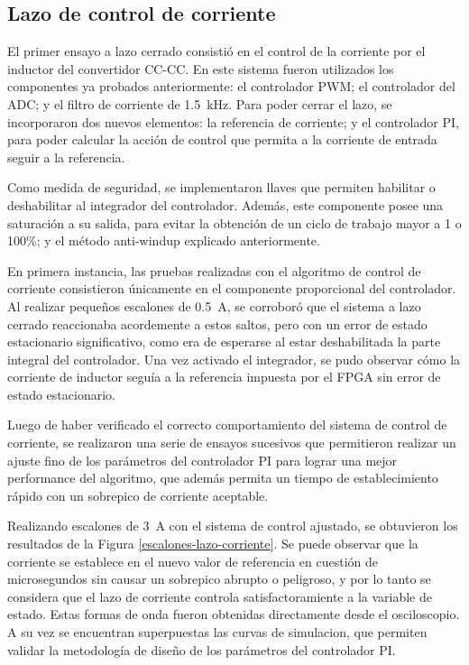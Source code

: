 \subsection{Lazo de control de corriente}

El primer ensayo a lazo cerrado consistió en el control de la corriente por el inductor del convertidor CC-CC. En este sistema fueron utilizados los componentes ya probados anteriormente: el controlador PWM; el controlador del ADC; y el filtro de corriente de \SI{1.5}{\kilo\hertz}. Para poder cerrar el lazo, se incorporaron dos nuevos elementos: la referencia de corriente; y el controlador PI, para poder calcular la acción de control que permita a la corriente de entrada seguir a la referencia.

Como medida de seguridad, se implementaron llaves que permiten habilitar o deshabilitar al integrador del controlador. Además, este componente posee una saturación a su salida, para evitar la obtención de un ciclo de trabajo mayor a 1 o 100\%; y el método anti-windup explicado anteriormente.

En primera instancia, las pruebas realizadas con el algoritmo de control de corriente consistieron únicamente en el componente proporcional del controlador. Al realizar pequeños escalones de \SI{0.5}{\ampere}, se corroboró que el sistema a lazo cerrado reaccionaba acordemente a estos saltos, pero con un error de estado estacionario significativo, como era de esperarse al estar deshabilitada la parte integral del controlador. Una vez activado el integrador, se pudo observar cómo la corriente de inductor seguía a la referencia impuesta por el FPGA sin error de estado estacionario.

Luego de haber verificado el correcto comportamiento del sistema de control de corriente, se realizaron una serie de ensayos sucesivos que permitieron realizar un ajuste fino de los parámetros del controlador PI para lograr una mejor performance del algoritmo, que además permita un tiempo de establecimiento rápido con un sobrepico de corriente aceptable.

Realizando escalones de \SI{3}{\ampere} con el sistema de control ajustado, se obtuvieron los resultados de la Figura \ref{escalones-lazo-corriente}. Se puede observar que la corriente se establece en el nuevo valor de referencia en cuestión de microsegundos sin causar un sobrepico abrupto o peligroso, y por lo tanto se considera que el lazo de corriente controla satisfactoramiente a la variable de estado. Estas formas de onda fueron obtenidas directamente desde el osciloscopio. A su vez se encuentran superpuestas las curvas de simulacion, que permiten validar la metodología de diseño de los parámetros del controlador PI.

